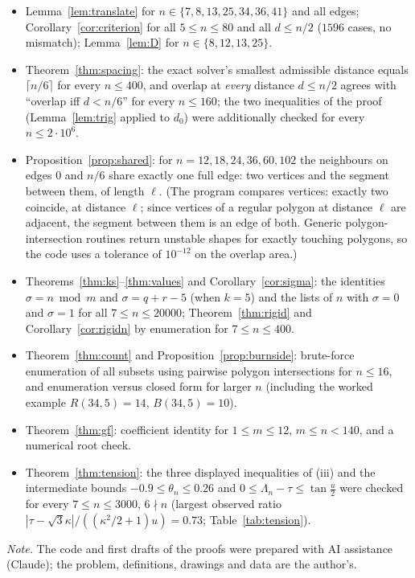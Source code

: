 \documentclass[11pt,a4paper]{article}
\theoremstyle{definition}
\theoremstyle{remark}
\begin{document}
\begin{itemize}[nosep]
\item Lemma~\ref{lem:translate} for $n\in\{7,8,13,25,34,36,41\}$ and all edges; Corollary~\ref{cor:criterion} for all $5\le n\le80$ and all $d\le n/2$ ($1596$ cases, no mismatch); Lemma~\ref{lem:D} for $n\in\{8,12,13,25\}$.
\item Theorem~\ref{thm:spacing}: the exact solver's smallest admissible distance equals $\lceil n/6\rceil$ for every $n\le400$, and overlap at \emph{every} distance $d\le n/2$ agrees with ``overlap iff $d<n/6$'' for every $n\le160$; the two inequalities of the proof (Lemma~\ref{lem:trig} applied to $d_0$) were additionally checked for every $n\le2\cdot10^6$.
\item Proposition~\ref{prop:shared}: for $n=12,18,24,36,60,102$ the neighbours on edges $0$ and $n/6$ share exactly one full edge: two vertices and the segment between them, of length $\ell$. (The program compares vertices: exactly two coincide, at distance $\ell$; since vertices of a regular polygon at distance $\ell$ are adjacent, the segment between them is an edge of both. Generic polygon-intersection routines return unstable shapes for exactly touching polygons, so the code uses a tolerance of $10^{-12}$ on the overlap area.)
\item Theorems~\ref{thm:ks}--\ref{thm:values} and Corollary~\ref{cor:sigma}: the identities $\sigma=n\bmod m$ and $\sigma=q+r-5$ (when $k=5$) and the lists of $n$ with $\sigma=0$ and $\sigma=1$ for all $7\le n\le20000$; Theorem~\ref{thm:rigid} and Corollary~\ref{cor:rigidn} by enumeration for $7\le n\le400$.
\item Theorem~\ref{thm:count} and Proposition~\ref{prop:burnside}: brute-force enumeration of all subsets using pairwise polygon intersections for $n\le16$, and enumeration versus closed form for larger $n$ (including the worked example $R(34,5)=14$, $B(34,5)=10$).
\item Theorem~\ref{thm:gf}: coefficient identity for $1\le m\le12$, $m\le n<140$, and a numerical root check.
\item Theorem~\ref{thm:tension}: the three displayed inequalities of (iii) and the intermediate bounds $-0.9\le\theta_n\le0.26$ and $0\le\Lambda_n-\tau\le\tan\frac u2$ were checked for every $7\le n\le3000$, $6\nmid n$ (largest observed ratio $|\tau-\sqrt3\kappa|/((\kappa^2/2+1)u)=0.73$; Table~\ref{tab:tension}).
\end{itemize}

\vfill
{\footnotesize\noindent\emph{Note.} The code and first drafts of the proofs were prepared with AI assistance (Claude); the problem, definitions, drawings and data are the author's.\par}
\end{document}
